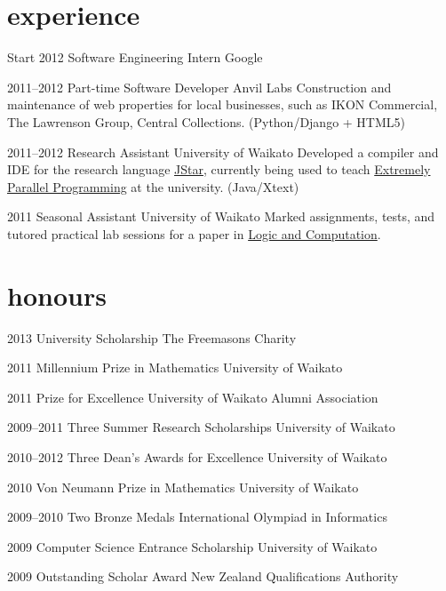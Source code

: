 \documentclass[]{boris-cv}
\begin{document}
\section{experience}

\begin{entrylist}
  \entry
    {Start 2012}
    {Software Engineering Intern}
    {Google}
    {}

  \entry
    {2011--2012}
    {Part-time Software Developer}
    {Anvil Labs}
    {Construction and maintenance of web properties for local businesses,
		such as IKON Commercial, The Lawrenson Group, Central Collections.
        (Python/Django + HTML5)}

  \entry
    {2011--2012}
    {Research Assistant}
    {University of Waikato}
    {Developed a compiler and IDE for the research language
    \href{http://www.cs.waikato.ac.nz/research/jstar/}{JStar}, currently being used to teach
    \href{http://papers.waikato.ac.nz/subjects/COMP/COMP553}
    {Extremely Parallel Programming} at the university. (Java/Xtext)}

  \entry
    {2011}
    {Seasonal Assistant}
    {University of Waikato}
    {Marked assignments, tests, and tutored
    practical lab sessions for a paper in 
    \href{http://papers.waikato.ac.nz/subjects/COMP/COMP235}
    {Logic and Computation}.}

\end{entrylist}

\pagebreak

\section{honours}
\begin{entrylist}
  \titleentry
    {2013}
    {University Scholarship}
    {The Freemasons Charity}

  \titleentry
    {2011}
    {Millennium Prize in Mathematics}
    {University of Waikato}

  \titleentry
    {2011}
    {Prize for Excellence}
    {University of Waikato Alumni Association}

  \titleentry
    {2009--2011}
    {Three Summer Research Scholarships}
    {University of Waikato}

  \titleentry
    {2010--2012}
    {Three Dean's Awards for Excellence}
    {University of Waikato}

  \titleentry
    {2010}
    {Von Neumann Prize in Mathematics}
    {University of Waikato}

  \titleentry
    {2009--2010}
    {Two Bronze Medals}
    {International Olympiad in Informatics}

  \titleentry
    {2009}
    {Computer Science Entrance Scholarship}
    {University of Waikato}

  \titleentry
    {2009}
    {Outstanding Scholar Award}
    {New Zealand Qualifications Authority}
\end{entrylist}
\end{document}
